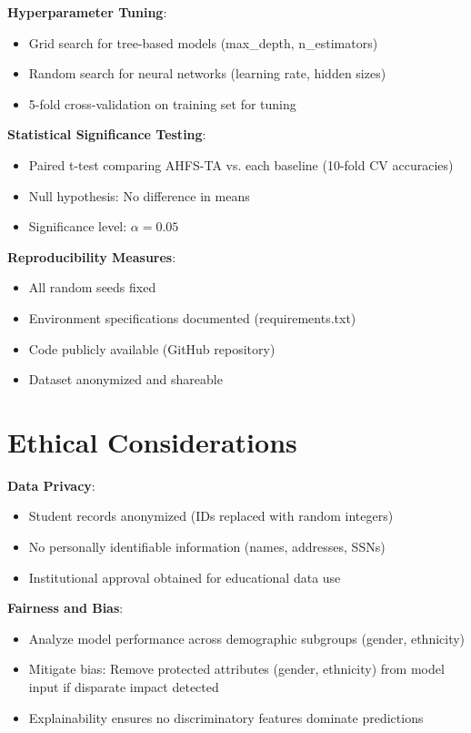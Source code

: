 \textbf{Hyperparameter Tuning}:
\begin{itemize}
\item Grid search for tree-based models (max_depth, n_estimators)
\item Random search for neural networks (learning rate, hidden sizes)
\item 5-fold cross-validation on training set for tuning
\end{itemize}

\textbf{Statistical Significance Testing}:
\begin{itemize}
\item Paired t-test comparing AHFS-TA vs. each baseline (10-fold CV accuracies)
\item Null hypothesis: No difference in means
\item Significance level: $\alpha = 0.05$
\end{itemize}

\textbf{Reproducibility Measures}:
\begin{itemize}
\item All random seeds fixed
\item Environment specifications documented (requirements.txt)
\item Code publicly available (GitHub repository)
\item Dataset anonymized and shareable
\end{itemize}

\section{Ethical Considerations}

\textbf{Data Privacy}:
\begin{itemize}
\item Student records anonymized (IDs replaced with random integers)
\item No personally identifiable information (names, addresses, SSNs)
\item Institutional approval obtained for educational data use
\end{itemize}

\textbf{Fairness and Bias}:
\begin{itemize}
\item Analyze model performance across demographic subgroups (gender, ethnicity)
\item Mitigate bias: Remove protected attributes (gender, ethnicity) from model input if disparate impact detected
\item Explainability ensures no discriminatory features dominate predictions
\end{itemize}

